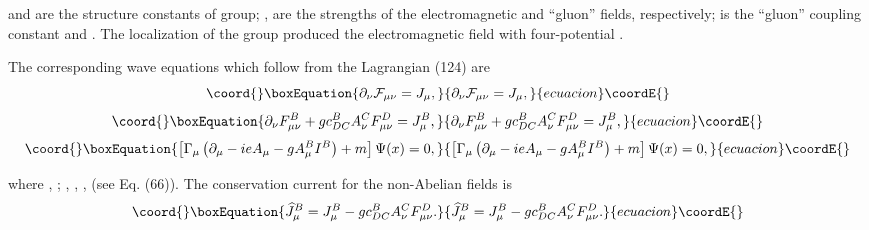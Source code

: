 \documentclass[a4paper,12pt]{article}
\begin{document}
and \coordHE{} are the structure constants of \coordHE{} group;
\coordHE{}, \coordHE{} are the strengths of
the electromagnetic and ``gluon'' fields, respectively; \coordHE{} is the
``gluon'' coupling constant and \coordHE{}  \myHighlight{$[\alpha \beta ],$}\coordHE{}  \myHighlight{$\widetilde{\mu },$}\coordHE{}  \coordHE{} . The localization of the
\coordHE{} group produced the electromagnetic field with
four-potential \coordHE{}.

The corresponding wave equations which follow from the Lagrangian
(124) are
\begin{equation}\coord{}\boxEquation{
\partial _\nu \mathcal{F}_{\mu \nu }=J_\mu  , \label{126}
}{
\partial _\nu \mathcal{F}_{\mu \nu }=J_\mu  , }{ecuacion}\coordE{}\end{equation}
\begin{equation}\coord{}\boxEquation{
\partial _\nu F_{\mu \nu }^B+gc_{DC}^BA_\nu ^CF_{\mu \nu }^D=J_\mu
^B ,\label{127}
}{
\partial _\nu F_{\mu \nu }^B+gc_{DC}^BA_\nu ^CF_{\mu \nu }^D=J_\mu
^B ,}{ecuacion}\coordE{}\end{equation}
\begin{equation}\coord{}\boxEquation{
\left[ \Gamma _\mu \left( \partial _\mu -ieA_\mu -gA_\mu
^BI^B\right) +m\right] \Psi (x)=0  ,\label{128}
}{
\left[ \Gamma _\mu \left( \partial _\mu -ieA_\mu -gA_\mu
^BI^B\right) +m\right] \Psi (x)=0  ,}{ecuacion}\coordE{}\end{equation}

where \coordHE{}, \coordHE{}; \coordHE{}, \coordHE{}, \coordHE{}, \myHighlight{$ \overline{\Gamma
}_5\overline{\Gamma }_\mu $}\coordHE{} (see Eq. (66)). The conservation
current for the non-Abelian fields is
\begin{equation}\coord{}\boxEquation{
\widehat{J}_\mu ^B=J_\mu ^B-gc_{DC}^BA_\nu ^CF_{\mu \nu }^D .
\label{129}
}{
\widehat{J}_\mu ^B=J_\mu ^B-gc_{DC}^BA_\nu ^CF_{\mu \nu }^D .
}{ecuacion}\coordE{}\end{equation}
\end{document}
